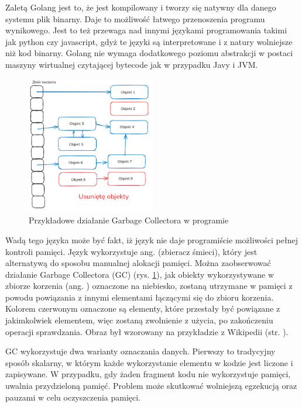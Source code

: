 Zaletą Golang jest to, że jest kompilowany i tworzy się natywny dla danego 
systemu plik binarny. Daje to możliwość łatwego przenoszenia programu wynikowego.
Jest to też przewaga nad innymi językami programowania takimi jak python czy
javascript, gdyż te języki są interpretowane i z natury wolniejsze niż kod 
binarny. Golang nie wymaga dodatkowego poziomu abstrakcji w postaci maszyny 
wirtualnej czytającej bytecode jak w przypadku Javy i JVM.

\begin{figure}[htbp]
    \centering
    \includegraphics[width=0.5\textwidth]{./images/GarbageCollector.png}
    \caption{Przykładowe działanie Garbage Collectora w programie}
    \label{fig:GarbageCollectorImage}
\end{figure}

Wadą tego języka może być fakt, iż język nie daje programiście możliwości pełnej
kontroli pamięci. Język wykorzystuje ang.  (zbieracz 
śmieci), który jest alternatywą do sposobu manualnej alokacji pamięci. Można 
zaobserwować działanie Garbage Collectora (GC) (rys. \ref{fig:GarbageCollectorImage}),
jak obiekty wykorzystywane w zbiorze korzenia (ang. ) oznaczone na 
niebiesko, zostaną utrzymane w pamięci z powodu powiązania z innymi elementami
łączącymi się do zbioru korzenia. Kolorem czerwonym oznaczone są elementy, które
przestały być powiązane z jakimkolwiek elementem, więc zostaną zwolnienie z 
użycia, po zakończeniu operacji sprawdzania. Obraz był wzorowany na przykładzie z
Wikipedii (str. \cite{bib:internet:GCImageWiki}).

GC wykorzystuje dwa warianty oznaczania danych. Pierwszy to tradycyjny sposób
skalarny, w którym każde wykorzystanie elementu w kodzie jest liczone i
zapisywane. W przypadku, gdy żaden fragment kodu nie wykorzystuje pamięci,
 uwalnia przydzieloną pamięć. Problem może skutkować
 wolniejszą egzekucją oraz pauzami w celu oczyszczenia pamięci.

